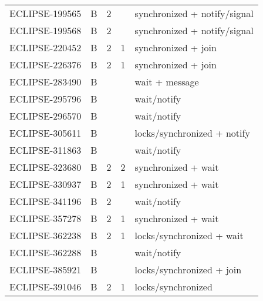 \begin{table}[!htp]
{\begin{tabular}{lllll}
    ECLIPSE-199565 & B        & 2             & ~               & synchronized + notify/signal                \\
    ECLIPSE-199568 & B        & 2             & ~               & synchronized + notify/signal                \\
    ECLIPSE-220452 & B        & 2             & 1               & synchronized + join                         \\
    ECLIPSE-226376 & B        & 2             & 1               & synchronized + join                         \\
    ECLIPSE-283490 & B        & ~             & ~               & wait + message                              \\
    ECLIPSE-295796 & B        & ~             & ~               & wait/notify                                 \\
    ECLIPSE-296570 & B        & ~             & ~               & wait/notify                                 \\
    ECLIPSE-305611 & B        & ~             & ~               & locks/synchronized + notify                 \\
    ECLIPSE-311863 & B        & ~             & ~               & wait/notify                                 \\
    ECLIPSE-323680 & B        & 2             & 2               & synchronized + wait                         \\
    ECLIPSE-330937 & B        & 2             & 1               & synchronized + wait                         \\
    ECLIPSE-341196 & B        & 2             & ~               & wait/notify                                 \\
    ECLIPSE-357278 & B        & 2             & 1               & synchronized + wait                         \\
    ECLIPSE-362238 & B        & 2             & 1               & locks/synchronized + wait                   \\
    ECLIPSE-362288 & B        & ~             & ~               & wait/notify                                 \\
    ECLIPSE-385921 & B        & ~             & ~               & locks/synchronized + join                   \\
    ECLIPSE-391046 & B        & 2             & 1               & locks/synchronized                          \\

\end{tabular}}
\end{table}
